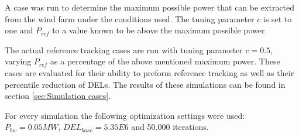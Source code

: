 A case was run to determine the maximum possible power that can be extracted from the wind farm under the conditions used. The tuning parameter $c$ is set to one and $P_{ref}$ to a value known to be above the maximum possible power. 

The actual reference tracking cases are run with tuning parameter $c = 0.5$, varying $P_{ref}$ as a percentage of the above mentioned maximum power. These cases are evaluated for their ability to preform reference tracking as well as their percentile reduction of DELs. The results of these simulations can be found in section \ref{sec:Simulation cases}.

For every simulation the following optimization settings were used: $P_{bw} = 0.05 MW$, $DEL_{base} = 5.35E6$ and 50.000 iterations. 